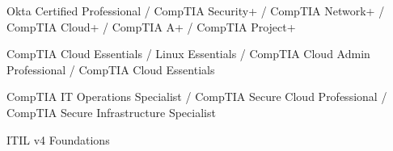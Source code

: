 
\begin{cvskills}

	\cvskill
	{}{Okta Certified Professional / CompTIA Security+ / CompTIA Network+ / CompTIA Cloud+ / CompTIA A+ / CompTIA Project+}

	\cvskill
	{}{CompTIA Cloud Essentials / Linux Essentials / CompTIA Cloud Admin Professional / CompTIA Cloud Essentials}

	\cvskill
	{}{CompTIA IT Operations Specialist / CompTIA Secure Cloud Professional / CompTIA Secure Infrastructure Specialist}

	\cvskill
	{}{ITIL v4 Foundations}

\end{cvskills}

